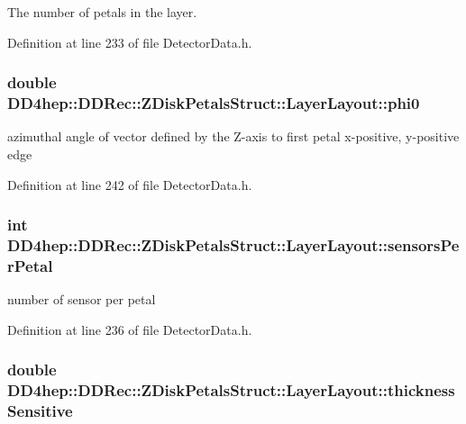The number of petals in the layer. 

Definition at line 233 of file DetectorData.h.\hypertarget{struct_d_d4hep_1_1_d_d_rec_1_1_z_disk_petals_struct_1_1_layer_layout_a9f475e0e0241b8d7198b0c0a3511dd2f}{
\subsubsection[{phi0}]{\setlength{\rightskip}{0pt plus 5cm}double {\bf DD4hep::DDRec::ZDiskPetalsStruct::LayerLayout::phi0}}}
\label{struct_d_d4hep_1_1_d_d_rec_1_1_z_disk_petals_struct_1_1_layer_layout_a9f475e0e0241b8d7198b0c0a3511dd2f}


azimuthal angle of vector defined by the Z-\/axis to first petal x-\/positive, y-\/positive edge 

Definition at line 242 of file DetectorData.h.\hypertarget{struct_d_d4hep_1_1_d_d_rec_1_1_z_disk_petals_struct_1_1_layer_layout_af4b922495a14cb54c5d6412ef1097d52}{
\subsubsection[{sensorsPerPetal}]{\setlength{\rightskip}{0pt plus 5cm}int {\bf DD4hep::DDRec::ZDiskPetalsStruct::LayerLayout::sensorsPerPetal}}}
\label{struct_d_d4hep_1_1_d_d_rec_1_1_z_disk_petals_struct_1_1_layer_layout_af4b922495a14cb54c5d6412ef1097d52}


number of sensor per petal 

Definition at line 236 of file DetectorData.h.\hypertarget{struct_d_d4hep_1_1_d_d_rec_1_1_z_disk_petals_struct_1_1_layer_layout_a49622208adfa9ec0dc736f92cfc82a46}{
\subsubsection[{thicknessSensitive}]{\setlength{\rightskip}{0pt plus 5cm}double {\bf DD4hep::DDRec::ZDiskPetalsStruct::LayerLayout::thicknessSensitive}}}
\label{struct_d_d4hep_1_1_d_d_rec_1_1_z_disk_petals_struct_1_1_layer_layout_a49622208adfa9ec0dc736f92cfc82a46}



